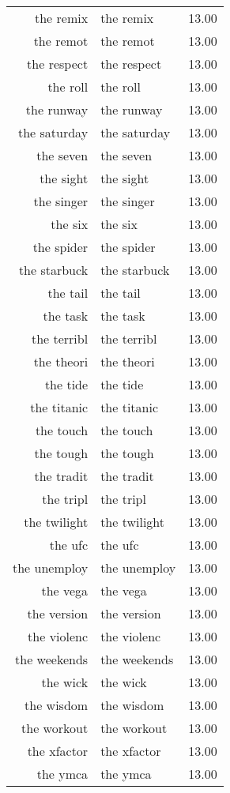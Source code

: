 \begin{table}[ht]
\begin{tabular}{rlr}
  the remix & the remix & 13.00 \\ 
  the remot & the remot & 13.00 \\ 
  the respect & the respect & 13.00 \\ 
  the roll & the roll & 13.00 \\ 
  the runway & the runway & 13.00 \\ 
  the saturday & the saturday & 13.00 \\ 
  the seven & the seven & 13.00 \\ 
  the sight & the sight & 13.00 \\ 
  the singer & the singer & 13.00 \\ 
  the six & the six & 13.00 \\ 
  the spider & the spider & 13.00 \\ 
  the starbuck & the starbuck & 13.00 \\ 
  the tail & the tail & 13.00 \\ 
  the task & the task & 13.00 \\ 
  the terribl & the terribl & 13.00 \\ 
  the theori & the theori & 13.00 \\ 
  the tide & the tide & 13.00 \\ 
  the titanic & the titanic & 13.00 \\ 
  the touch & the touch & 13.00 \\ 
  the tough & the tough & 13.00 \\ 
  the tradit & the tradit & 13.00 \\ 
  the tripl & the tripl & 13.00 \\ 
  the twilight & the twilight & 13.00 \\ 
  the ufc & the ufc & 13.00 \\ 
  the unemploy & the unemploy & 13.00 \\ 
  the vega & the vega & 13.00 \\ 
  the version & the version & 13.00 \\ 
  the violenc & the violenc & 13.00 \\ 
  the weekends & the weekends & 13.00 \\ 
  the wick & the wick & 13.00 \\ 
  the wisdom & the wisdom & 13.00 \\ 
  the workout & the workout & 13.00 \\ 
  the xfactor & the xfactor & 13.00 \\ 
  the ymca & the ymca & 13.00 \\ 

\end{tabular}
\end{table}
